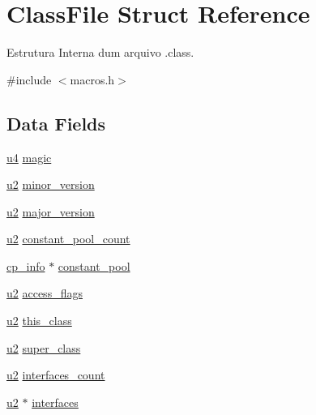 \hypertarget{struct_class_file}{}\section{Class\+File Struct Reference}
\label{struct_class_file}


Estrutura Interna dum arquivo .class.  




{\ttfamily \#include $<$macros.\+h$>$}

\subsection*{Data Fields}
\begin{DoxyCompactItemize}
\item 
\hyperlink{macros_8h_a4af10c3137cf79c12265e8d288070711}{u4} \hyperlink{struct_class_file_a9c187266c328a40ddc2dde8c8a230a65}{magic}
\item 
\hyperlink{macros_8h_aa76d8c8015643c6a837661a10142016e}{u2} \hyperlink{struct_class_file_ad0028839ce12090266cbdc5df1046062}{minor\+\_\+version}
\item 
\hyperlink{macros_8h_aa76d8c8015643c6a837661a10142016e}{u2} \hyperlink{struct_class_file_a5a3ef20c14bd517fca3fa5841846ab4b}{major\+\_\+version}
\item 
\hyperlink{macros_8h_aa76d8c8015643c6a837661a10142016e}{u2} \hyperlink{struct_class_file_a0d64ff67928a39e52a75c972b5f5697a}{constant\+\_\+pool\+\_\+count}
\item 
\hyperlink{structcp__info}{cp\+\_\+info} $\ast$ \hyperlink{struct_class_file_ace3229f6e4d460d20e72e493d180ecc5}{constant\+\_\+pool}
\item 
\hyperlink{macros_8h_aa76d8c8015643c6a837661a10142016e}{u2} \hyperlink{struct_class_file_a4cc32d48303aeaaaaea05bf77abdec59}{access\+\_\+flags}
\item 
\hyperlink{macros_8h_aa76d8c8015643c6a837661a10142016e}{u2} \hyperlink{struct_class_file_afd1a9f5d893befc9ea66f915fd6fa039}{this\+\_\+class}
\item 
\hyperlink{macros_8h_aa76d8c8015643c6a837661a10142016e}{u2} \hyperlink{struct_class_file_a85a7fa4c7fd5d455b77e525d952f440f}{super\+\_\+class}
\item 
\hyperlink{macros_8h_aa76d8c8015643c6a837661a10142016e}{u2} \hyperlink{struct_class_file_a5d766202b705d1bdb025a0e7fff8953c}{interfaces\+\_\+count}
\item 
\hyperlink{macros_8h_aa76d8c8015643c6a837661a10142016e}{u2} $\ast$ \hyperlink{struct_class_file_a31608612612ea019eef47ae5d656dc23}{interfaces}

\end{DoxyCompactItemize}
